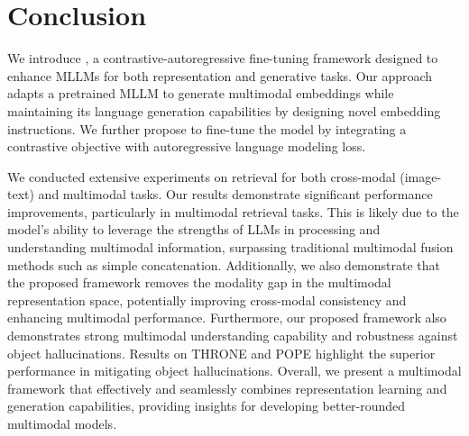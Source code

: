 \section{Conclusion}

We introduce \algname, a contrastive-autoregressive fine-tuning framework designed to enhance MLLMs for both representation and generative tasks. Our approach adapts a pretrained MLLM to generate multimodal embeddings while maintaining its language generation capabilities by designing novel embedding instructions. We further propose to fine-tune the model by integrating a contrastive objective with autoregressive language modeling loss.

We conducted extensive experiments on retrieval for both cross-modal (image-text) and multimodal tasks. Our results demonstrate significant performance improvements, particularly in multimodal retrieval tasks. This is likely due to the model's ability to leverage the strengths of LLMs in processing and understanding multimodal information, surpassing traditional multimodal fusion methods such as simple concatenation. Additionally, we also demonstrate that the proposed framework removes the modality gap in the multimodal representation space, potentially improving cross-modal consistency and enhancing multimodal performance.
Furthermore, our proposed framework also demonstrates strong multimodal understanding capability and robustness against object hallucinations. Results on THRONE and POPE highlight the superior performance in mitigating object hallucinations. 
%
Overall, we present a multimodal framework that effectively and seamlessly combines representation learning and generation capabilities, providing insights for developing better-rounded multimodal models.
%

